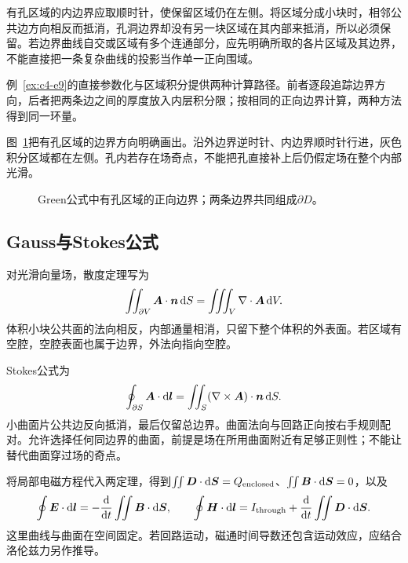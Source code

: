 有孔区域的内边界应取顺时针，使保留区域仍在左侧。将区域分成小块时，相邻公共边方向相反而抵消，孔洞边界却没有另一块区域在其内部来抵消，所以必须保留。若边界曲线自交或区域有多个连通部分，应先明确所取的各片区域及其边界，不能直接把一条复杂曲线的投影当作单一正向围域。

例~\ref{ex:c4-e9}的直接参数化与区域积分提供两种计算路径。前者逐段追踪边界方向，后者把两条边之间的厚度放入内层积分限；按相同的正向边界计算，两种方法得到同一环量。

图~\ref{fig:c4-boundary-hole}把有孔区域的边界方向明确画出。沿外边界逆时针、内边界顺时针行进，灰色积分区域都在左侧。孔内若存在场奇点，不能把孔直接补上后仍假定场在整个内部光滑。
\begin{figure}[H]\centering
{}
\caption{Green公式中有孔区域的正向边界；两条边界共同组成$\partial D$。}\label{fig:c4-boundary-hole}
\end{figure}

\subsection{Gauss与Stokes公式}
对光滑向量场，散度定理写为
\[\iint_{\partial V}\bm{A}\cdot\bm{n}\mathop{}\!\mathrm d S=\iiint_V\nabla\cdot\bm{A}\mathop{}\!\mathrm d V.
\]
体积小块公共面的法向相反，内部通量相消，只留下整个体积的外表面。若区域有空腔，空腔表面也属于边界，外法向指向空腔。

Stokes公式为
\[\oint_{\partial S}\bm{A}\cdot\mathop{}\!\mathrm d\bm{l}=\iint_S(\nabla\times\bm{A})\cdot\bm{n}\mathop{}\!\mathrm d S.
\]
小曲面片公共边反向抵消，最后仅留总边界。曲面法向与回路正向按右手规则配对。允许选择任何同边界的曲面，前提是场在所用曲面附近有足够正则性；不能让替代曲面穿过场的奇点。

将局部电磁方程代入两定理，得到$\iint\bm{D}\cdot\mathop{}\!\mathrm d\bm{S}=Q_{\rm enclosed}$、$\iint\bm{B}\cdot\mathop{}\!\mathrm d\bm{S}=0$，以及
\[\oint\vct E\cdot\dd\vct l=-\frac{\dd}{\dd t}\iint\vct B\cdot\dd\vct S,\qquad
\oint\vct H\cdot\dd\vct l=I_{\rm through}+\frac{\dd}{\dd t}\iint\vct D\cdot\dd\vct S.
\]
这里曲线与曲面在空间固定。若回路运动，磁通时间导数还包含运动效应，应结合洛伦兹力另作推导。

